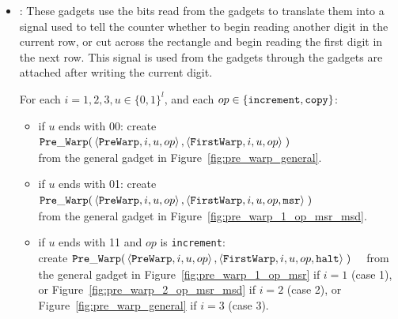     \begin{itemize}

        \item {\prewarp}: These gadgets use the bits read from the {\cread} gadgets to translate them into
                          a signal used to tell the counter whether to begin reading
                          another digit in the current row, or cut across the rectangle and begin reading the
                          first digit in the next row. This signal is used from the {\prewarp} gadgets through
                          the {\dtop} gadgets are attached after writing the current digit.

            For each $i = 1,2,3, u \in \{0, 1\}^l$, and each $op \in \{ {\tt increment, copy } \}$:
            \begin{itemize}


            \item if $u$ ends with 00:
            create
            $\begin{aligned}[t]
                {\tt Pre\_Warp}(& \left\langle {\tt PreWarp},   i, u, op \right\rangle,
                           \left\langle {\tt FirstWarp}, i, u, op \right\rangle \;)
            \end{aligned}$ \\ from the general gadget in Figure~\ref{fig:pre_warp_general}.

            \item if $u$ ends with 01:
            create
            $\begin{aligned}[t]
                {\tt Pre\_Warp}(& \left\langle {\tt PreWarp},   i, u, op \right\rangle,
                           \left\langle {\tt FirstWarp}, i, u, op, {\tt msr} \right\rangle \;)
            \end{aligned}$ \\ from the general gadget in Figure~\ref{fig:pre_warp_1_op_msr_msd}.


            \item if $u$ ends with 11 and $op$ is {\tt increment}:\\
            create
            $\begin{aligned}[t]
                {\tt Pre\_Warp}(& \left\langle {\tt PreWarp},   i, u, op             \right\rangle,
                \left\langle {\tt FirstWarp},            i, u, op, {\tt halt} \right\rangle \;)
            \end{aligned}$ from the general gadget in Figure~\ref{fig:pre_warp_1_op_msr} if $i = 1$ (case 1),
            or Figure~\ref{fig:pre_warp_2_op_msr_msd} if $i = 2$ (case 2), or Figure~\ref{fig:pre_warp_general} if $i = 3$ (case 3).



\end{itemize}
\end{itemize}
